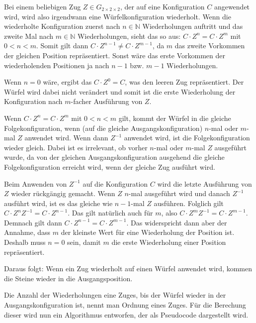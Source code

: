 \documentclass[12pt,a4paper, usenames, dvipsnames]{article}
\theoremstyle{mystyle}
\theoremstyle{definition}
\newcommand{\Gtwo}{\ensuremath{G_{2\times 2\times 2}}}
\begin{document}
Bei einem beliebigen Zug $Z \in \Gtwo$, der auf eine Konfiguration $C$ angewendet wird, wird also irgendwann eine Würfelkonfiguration wiederholt. Wenn die wiederholte Konfiguration zuerst nach $n \in \mathbb{N}$ Wiederholungen auftritt und das zweite Mal nach $m \in \mathbb{N}$ Wiederholungen, sieht das so aus: $C \cdot Z^n=C \cdot Z^m$ mit $0 < n < m$.
Somit gilt dann $C \cdot Z^{n-1} \neq C \cdot Z^{m-1}$, da $m$ das zweite Vorkommen der gleichen Position repräsentiert.
Sonst wäre das erste Vorkommen der wiederholenden Positionen ja nach $n-1$ bzw. $m-1$ Wiederholungen.

Wenn $n=0$ wäre, ergibt das $C \cdot Z^0=C$, was den leeren Zug repräsentiert. Der Würfel wird dabei nicht verändert und somit ist die erste Wiederholung der Konfiguration nach $m$-facher Ausführung von $Z$.

Wenn $C \cdot Z^n =C \cdot Z^m$ mit $0<n<m$ gilt, kommt der Würfel in die gleiche Folgekonfiguration, wenn (auf die gleiche Ausgangskonfiguration) $n$-mal oder $m$-mal $Z$ anwendet wird.
Wenn dann $Z^{-1}$ anwendet wird, ist die Folgekonfiguration wieder gleich. Dabei ist es irrelevant, ob vorher $n$-mal oder $m$-mal $Z$ ausgeführt wurde, da von der gleichen Ausgangskonfiguration ausgehend die gleiche Folgekonfiguration erreicht wird, wenn der gleiche Zug ausführt wird.

Beim Anwenden von $Z^{-1}$ auf die Konfiguration $C$ wird die letzte Ausführung von $Z$ wieder rückgängig gemacht. Wenn $Z$ $n$-mal ausgeführt wird und danach $Z^{-1}$ ausführt wird, ist es das gleiche wie $n-1$-mal $Z$ ausführen. Folglich gilt $C \cdot Z^nZ^{-1}=C \cdot Z^{n-1}$. Das gilt natürlich auch für $m$, also $C \cdot Z^mZ^{-1}=C \cdot Z^{m-1}$.
Demnach gilt dann $C \cdot Z^{n-1}=C \cdot Z^{m-1}$. Das widerspricht dann aber der Annahme, dass $m$ der kleinste Wert für eine Wiederholung der Position ist. Deshalb muss $n=0$ sein, damit $m$ die erste Wiederholung einer Position repräsentiert. 

Daraus folgt: Wenn ein Zug wiederholt auf einen Würfel anwendet wird, kommen die Steine wieder in die Ausgangsposition.


Die Anzahl der Wiederholungen eine Zuges, bis der Würfel wieder in der Ausgangskonfiguration ist, nennt man Ordnung eines Zuges. Für die Berechung dieser wird nun ein Algorithmus entworfen, der als Pseudocode dargestellt wird.
\end{document}

